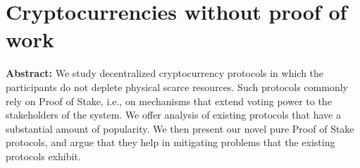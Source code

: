 \section{Cryptocurrencies without proof of work}

\textbf{Abstract:} 
We study decentralized cryptocurrency protocols in which the participants do not deplete physical scarce resources. Such protocols commonly rely on Proof of Stake, i.e., on mechanisms that extend voting power to the stakeholders of the system. We offer analysis of existing protocols that have a substantial amount of popularity. We then present our novel pure Proof of Stake protocols, and argue that they help in mitigating problems that the existing protocols exhibit.
